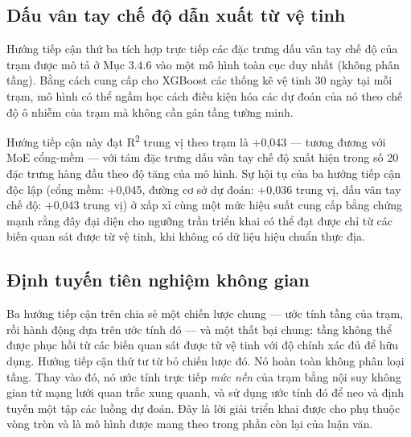 \subsection{Dấu vân tay chế độ dẫn xuất từ vệ tinh}

Hướng tiếp cận thứ ba tích hợp trực tiếp các đặc trưng dấu vân tay chế độ của trạm được mô tả ở Mục 3.4.6 vào một mô hình toàn cục duy nhất (không phân tầng). Bằng cách cung cấp cho XGBoost các thống kê vệ tinh 30 ngày tại mỗi trạm, mô hình có thể ngầm học cách điều kiện hóa các dự đoán của nó theo chế độ ô nhiễm của trạm mà không cần gán tầng tường minh.

Hướng tiếp cận này đạt R\textsuperscript{2} trung vị theo trạm là +0,043 --- tương đương với MoE cổng-mềm --- với tám đặc trưng dấu vân tay chế độ xuất hiện trong số 20 đặc trưng hàng đầu theo độ tăng của mô hình. Sự hội tụ của ba hướng tiếp cận độc lập (cổng mềm: +0,045, đường cơ sở dự đoán: +0,036 trung vị, dấu vân tay chế độ: +0,043 trung vị) ở xấp xỉ cùng một mức hiệu suất cung cấp bằng chứng mạnh rằng đây đại diện cho ngưỡng trần triển khai có thể đạt được chỉ từ các biến quan sát được từ vệ tinh, khi không có dữ liệu hiệu chuẩn thực địa.

\subsection{Định tuyến tiên nghiệm không gian}

Ba hướng tiếp cận trên chia sẻ một chiến lược chung --- ước tính tầng của trạm, rồi hành động dựa trên ước tính đó --- và một thất bại chung: tầng không thể được phục hồi từ các biến quan sát được từ vệ tinh với độ chính xác đủ để hữu dụng. Hướng tiếp cận thứ tư từ bỏ chiến lược đó. Nó hoàn toàn không phân loại tầng. Thay vào đó, nó ước tính trực tiếp \emph{mức nền} của trạm bằng nội suy không gian từ mạng lưới quan trắc xung quanh, và sử dụng ước tính đó để neo và định tuyến một tập các luồng dự đoán. Đây là lời giải triển khai được cho phụ thuộc vòng tròn và là mô hình được mang theo trong phần còn lại của luận văn.

